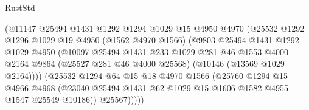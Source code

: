 \begin{lexlean}{RustStd}
\begin{coremodule}
                              (@11147
                                @25494
                                @1431
                                @1292
                                @1294
                                @1029
                                @15
                                @4950
                                @4970
                                (@25532
                                  @1292
                                  @1296
                                  @1029
                                  @19
                                  @4950
                                  (@1562 @4970 @1566)
                                  (@9803
                                    @25494
                                    @1431
                                    @1292
                                    @1029
                                    @4950
                                    (@10097
                                      @25494
                                      @1431
                                      @233
                                      @1029
                                      @281
                                      @46
                                      @1553
                                      @4000
                                      @2164
                                      @9864
                                      (@25527 @281 @46 @4000 @25568)
                                      (@10146 (@13569 @1029 @2164))))
                                  (@25532
                                    @1294
                                    @64
                                    @15
                                    @18
                                    @4970
                                    @1566
                                    (@25760
                                      @1294
                                      @15
                                      @4966
                                      @4968
                                      (@23040
                                        @25494
                                        @1431
                                        @62
                                        @1029
                                        @15
                                        @1606
                                        @1582
                                        @4955
                                        @1547
                                        @25549
                                        @10186))
                                    @25567)))))

\end{coremodule}
\end{lexlean}
